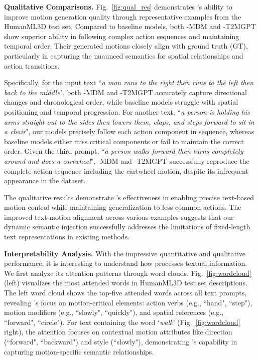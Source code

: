 \textbf{Qualitative Comparisons.}
Fig.~\ref{fig:qual_res} demonstrates {\modulename}'s ability to improve motion generation quality through representative examples from the HumanML3D test set. Compared to baseline models, both {\modulename}-MDM and {\modulename}-T2MGPT show superior ability in following complex action sequences and maintaining temporal order. 
Their generated motions closely align with ground truth (GT), particularly in capturing the nuaunced semantics for spatial relationships and action transitions.

Specifically, for the input text ``\textit{a man runs to the right then runs to the left then back to the middle}", both {\modulename}-MDM and {\modulename}-T2MGPT accurately capture directional changes and chronological order, while baseline models struggle with spatial positioning and temporal progression. 
For another text, ``\textit{a person is holding his arms straight out to the sides then lowers them, claps, and steps forward to sit in a chair}", our models precisely follow each action component in sequence, whereas baseline models either miss critical components or fail to maintain the correct order. 
Given the third prompt, ``\textit{a person walks forward then turns completely around and does a cartwheel}", {\modulename}-MDM and {\modulename}-T2MGPT successfully reproduce the complete action sequence including the cartwheel motion, despite its infrequent appearance in the dataset.

The qualitative results demonstrate {\modulename}'s effectiveness in enabling precise text-based motion control while maintaining generalization to less common actions. 
The improved text-motion alignment across various examples suggests that our dynamic semantic injection successfully addresses the limitations of fixed-length text representations in existing methods.




\textbf{Interpretability Analysis.}
With the impressive quantitative and qualitative performance, it is interesting to understand how {\modulename} processes textual information. 
We first analyze its attention patterns through word clouds. 
Fig.~\ref{fig:wordcloud} (left) visualizes the most attended words in HumanML3D test set descriptions. The left word cloud shows the top-five attended words across all text prompts, revealing {\modulename}'s focus on motion-critical elements: action verbs (e.g., ``hand", ``step"), motion modifiers (e.g., ``slowly", ``quickly"), and spatial references (e.g., ``forward", ``circle"). For text containing the word `\textit{walk}' (Fig.~\ref{fig:wordcloud} right), the attention focuses on contextual motion attributes like direction (``forward", ``backward") and style (``slowly"), demonstrating {\modulename}'s capability in capturing motion-specific semantic relationships.

